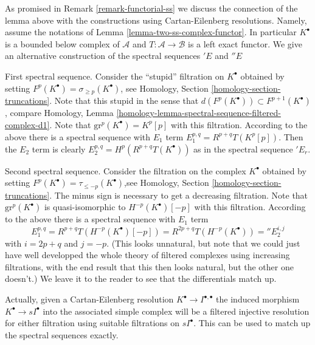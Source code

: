 \begin{remark}
\label{remark-final-functorial}
As promised in
Remark \ref{remark-functorial-ss}
we discuss the connection of the lemma
above with the constructions using Cartan-Eilenberg resolutions.
Namely, assume the notations of
Lemma \ref{lemma-two-ss-complex-functor}.
In particular $K^\bullet$ is a bounded below complex of
$\mathcal{A}$ and $T : \mathcal{A} \to \mathcal{B}$ is a
left exact functor. We give an alternative construction of the
spectral sequences ${}'E$ and ${}''E$ 

\medskip\noindent
First spectral sequence. Consider the ``stupid'' filtration
on $K^\bullet$
obtained by setting $F^p(K^\bullet) = \sigma_{\geq p}(K^\bullet)$, see
Homology, Section \ref{homology-section-truncations}.
Note that this stupid in the sense that
$d(F^p(K^\bullet)) \subset F^{p + 1}(K^\bullet)$, compare
Homology, Lemma \ref{homology-lemma-spectral-sequence-filtered-complex-d1}.
Note that $\text{gr}^p(K^\bullet) = K^p[p]$ with this filtration.
According to the above there is a spectral sequence
with $E_1$ term $E_1^{p, q} = R^{p + q}T(K^p[p])$.
Then the $E_2$ term is clearly $E_2^{p, q} = H^p(R^{p + q}T(K^\bullet))$
as in the spectral sequence ${}'E_r$.

\medskip\noindent
Second spectral sequence. Consider the filtration on the complex $K^\bullet$
obtained by setting $F^p(K^\bullet) = \tau_{\leq -p}(K^\bullet)$,see
Homology, Section \ref{homology-section-truncations}.
The minus sign is necessary
to get a decreasing filtration. Note that
$\text{gr}^p(K^\bullet)$ is quasi-isomorphic to $H^{-p}(K^\bullet)[-p]$
with this filtration. According to the above there is a spectral sequence
with $E_1$ term
$$
E_1^{p, q}
= R^{p + q}T(H^{-p}(K^\bullet)[-p])
= R^{2p + q}T(H^{-p}(K^\bullet)) = {}''E_2^{i, j}
$$
with $i = 2p + q$ and $j = -p$. (This looks unnatural, but note that we
could just have well developped the whole theory of filtered complexes
using increasing filtrations, with the end result that this then looks
natural, but the other one doesn't.) We leave it to the reader to see
that the differentials match up.

\medskip\noindent
Actually, given a Cartan-Eilenberg resolution
$K^\bullet \to I^{\bullet, \bullet}$ the induced morphism
$K^\bullet \to sI^\bullet$ into the associated simple complex
will be a filtered injective resolution for either filtration
using suitable filtrations on $sI^\bullet$. This can be used
to match up the spectral sequences exactly.
\end{remark}






